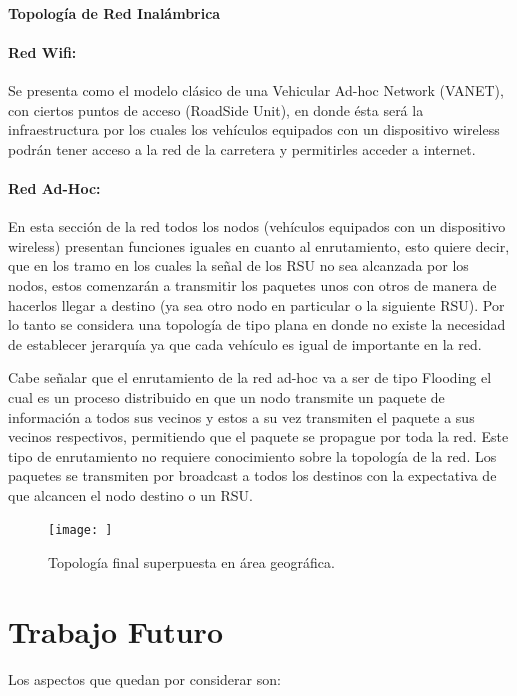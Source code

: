 \documentclass[12pt]{article}
\begin{document}
\paragraph{Topología de Red Inalámbrica}
\paragraph{Red Wifi:} 
Se presenta como el modelo clásico de una Vehicular Ad-hoc Network (VANET), con ciertos puntos de acceso 
(RoadSide Unit), en donde ésta será la infraestructura por los cuales los vehículos equipados con un
dispositivo wireless podrán tener acceso a la red de la carretera y permitirles acceder a internet.

\paragraph{Red Ad-Hoc:}
En esta sección de la red todos los nodos (vehículos equipados con un dispositivo wireless) presentan 
funciones iguales en cuanto al enrutamiento, esto quiere decir, que en los tramo en los cuales la señal de 
los RSU no sea alcanzada por los nodos, estos comenzarán a transmitir los paquetes unos con otros de manera 
de hacerlos llegar a destino (ya sea otro nodo en particular o la siguiente RSU). Por lo tanto se considera 
una topología de tipo plana en donde no existe la necesidad de establecer jerarquía ya que cada vehículo es 
igual de importante en la red.

Cabe señalar que el enrutamiento de la red ad-hoc va a ser de tipo Flooding el cual es un proceso 
distribuido en que un nodo transmite un paquete de información a todos sus vecinos y estos a su vez 
transmiten el paquete a sus vecinos respectivos, permitiendo que el paquete se propague por toda la red. 
Este tipo de enrutamiento no requiere conocimiento sobre la topología de la red. Los paquetes se 
transmiten por broadcast a todos los destinos con la expectativa de que alcancen el nodo destino o un RSU.

\begin{figure}[H]
  \centering
      \texttt{[image: ]}
	    \caption{Topología final superpuesta en área geográfica.}
	\label{fig:top_final}
\end{figure}

\newpage
\section{Trabajo Futuro}
Los aspectos que quedan por considerar son:\\
\end{document}
